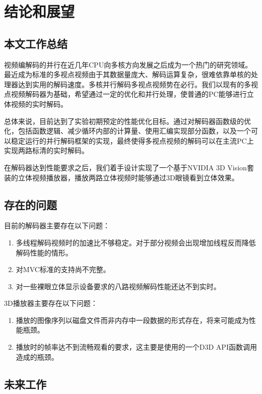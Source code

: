 

\chapter{结论和展望}
\label{cha:conclusionandforesight}

\section{本文工作总结}
\label{sec:conclusion}
视频编解码的并行在近几年CPU向多核方向发展之后成为一个热门的研究领域。最近成为标准的多视点视频由于其数据量庞大、解码运算复杂，很难依靠单核的处理器达到实用的解码速度。多核并行解码多视点视频势在必行。我们以现有的多视点视频解码器为基础，希望通过一定的优化和并行处理，使普通的PC能够进行立体视频的实时解码。

总体来说，目前达到了实验初期预定的性能优化目标。通过对解码器函数级的优化，包括函数逻辑、减少循环内部的计算量、使用汇编实现部分函数，以及一个可以稳定运行的并行解码框架的实现，最终使得多视点视频的解码可以在主流PC上实现两路标清的实时解码。

在解码器达到性能要求之后，我们着手设计实现了一个基于NVIDIA 3D Vision套装的立体视频播放器，播放两路立体视频时能够通过3D眼镜看到立体效果。

\section{存在的问题}
\label{sec:probremained}

目前的解码器主要存在以下问题：
\begin{enumerate}
\item 多线程解码视频时的加速比不够稳定。对于部分视频会出现增加线程反而降低解码性能的情形。
\item 对MVC标准的支持尚不完整。
\item 对一些裸眼立体显示设备要求的八路视频解码性能还达不到实时。
\end{enumerate}

3D播放器主要存在以下问题：
\begin{enumerate}
\item 播放的图像序列以磁盘文件而非内存中一段数据的形式存在，将来可能成为性能瓶颈。
\item 播放时的帧率达不到流畅观看的要求，这主要是使用的一个D3D API函数调用造成的瓶颈。
\end{enumerate}


\section{未来工作}
\label{sec:futurework}

